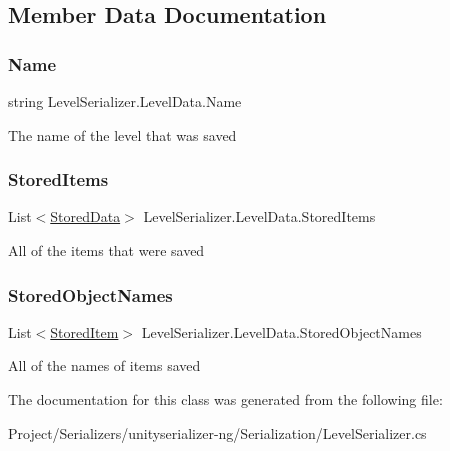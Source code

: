 \subsection{Member Data Documentation}
\mbox{\label{class_level_serializer_1_1_level_data_a48a7e96d392fff3d3060654c329c4cda}} 
\subsubsection{\texorpdfstring{Name}{Name}}
{\footnotesize\ttfamily string Level\+Serializer.\+Level\+Data.\+Name}



The name of the level that was saved 

\mbox{\label{class_level_serializer_1_1_level_data_abcbeea8b0c4fa1b1d58ef82c3440e18d}} 
\subsubsection{\texorpdfstring{Stored\+Items}{StoredItems}}
{\footnotesize\ttfamily List$<$\hyperlink{class_level_serializer_1_1_stored_data}{Stored\+Data}$>$ Level\+Serializer.\+Level\+Data.\+Stored\+Items}



All of the items that were saved 

\mbox{\label{class_level_serializer_1_1_level_data_a9856376db0262a37e33f3c37ff90dcc9}} 
\subsubsection{\texorpdfstring{Stored\+Object\+Names}{StoredObjectNames}}
{\footnotesize\ttfamily List$<$\hyperlink{class_level_serializer_1_1_stored_item}{Stored\+Item}$>$ Level\+Serializer.\+Level\+Data.\+Stored\+Object\+Names}



All of the names of items saved 



The documentation for this class was generated from the following file\+:\begin{DoxyCompactItemize}
\item 
Project/\+Serializers/unityserializer-\/ng/\+Serialization/Level\+Serializer.\+cs\end{DoxyCompactItemize}
